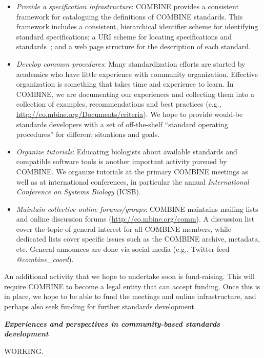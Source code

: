 \begin{itemize}
\item \emph{Provide a specification infrastructure}: COMBINE provides a consistent framework for cataloguing the definitions of COMBINE standards. This framework includes a consistent, hierarchical identifier scheme for identifying standard specifications; a URI scheme for locating specifications and standards~\cite[using Identifiers.org to provide permanent, resolvable URIs for standards;][]{Juty2012}; and a web page structure for the description of each standard.

\item \emph{Develop common procedures}: Many standardization efforts are started by academics who have little experience with community organization.  Effective organization is something that takes time and experience to learn.  In COMBINE, we are documenting our experiences and collecting them into a collection of examples, recommendations and best practices (e.g., \url{http://co.mbine.org/Documents/criteria}).  We hope to provide would-be standards developers with a set of off-the-shelf ``standard operating procedures'' for different situations and goals.

\item \emph{Organize tutorials}: Educating biologists about available standards and compatible software tools is another important activity pursued by COMBINE.  We organize tutorials at the primary COMBINE meetings as well as at international conferences, in particular the annual \emph{International Conference on Systems Biology} (ICSB).

\item \emph{Maintain collective online forums/groups}:  COMBINE maintains mailing lists and online discussion forums (\url{http://co.mbine.org/comm}).  A discussion list cover the topic of general interest for all COMBINE members, while dedicated lists cover specific issues such as the COMBINE archive, metadata, etc.  General announces are done via social media (e.g., Twitter feed \emph{@combine\_coord}).

\end{itemize}


An additional activity that we hope to undertake soon is fund-raising.  This will require COMBINE to become a legal entity that can accept funding.  Once this is in place, we hope to be able to fund the meetings and online infrastructure, and perhaps also seek funding for further standards development.


\clearpage
\textbf{\textsl{Experiences and perspectives in community-based standards development}}

WORKING.

